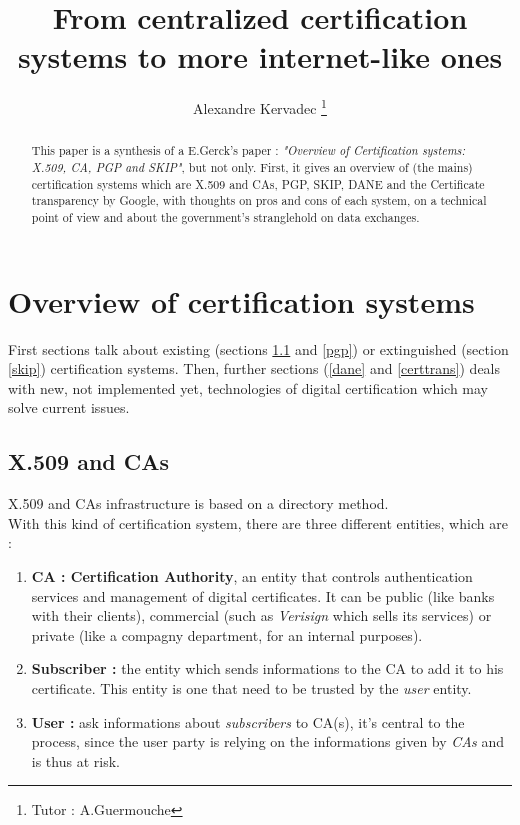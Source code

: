 \documentclass[journal, a4paper]{IEEEtran}
\begin{document}
	\title{From centralized certification systems to more internet-like ones}
	\author{Alexandre Kervadec
	\thanks{Tutor : A.Guermouche}}
	\maketitle

\begin{abstract}
This paper is a synthesis of a E.Gerck's paper : \textit{"Overview of Certification systems: X.509, CA, PGP and SKIP"}\cite{gerck1998overview}, but not only. First, it gives an overview of (the mains) certification systems which are X.509 and CAs, PGP, SKIP, DANE and the Certificate transparency by Google, with thoughts on pros and cons of each system, on a technical point of view and about the government's stranglehold on data exchanges.
\end{abstract}

\section{Overview of certification systems}

First sections talk about existing (sections \ref{x509} and \ref{pgp}) or extinguished (section \ref{skip}) certification systems. Then, further sections (\ref{dane} and \ref{certtrans}) deals with new, not implemented yet, technologies of digital certification which may solve current issues. 


\subsection{X.509 and CAs}
\label{x509}

X.509 and CAs\cite{rfc3647} infrastructure is based on a directory method.\\
With this kind of certification system, there are three different entities, which are :

\begin{enumerate}
	\item \textbf{CA : Certification Authority}, an entity that controls authentication services and management of digital certificates. It can be public (like banks with their clients), commercial (such as \textit{Verisign} which sells its services) or private (like a compagny department, for an internal purposes).
	\item \textbf{Subscriber :} the entity which sends informations to the CA to add it to his certificate. This entity is one that need to be trusted by the \textit{user} entity.
	\item \textbf{User :} ask informations about \textit{subscribers} to CA(s), it's central to the process, since the user party is relying on the informations given by \textit{CAs} and is thus at risk.
\end{enumerate}
\end{document}
